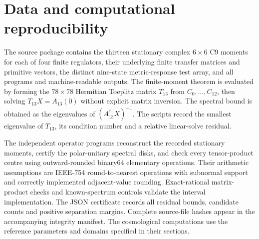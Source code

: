 \documentclass[11pt,a4paper]{article}
\numberwithin{equation}{section}
\begin{document}
\section{Data and computational reproducibility}

The source package contains the thirteen stationary complex $6\times6$ C9 moments for each of four finite regulators, their underlying finite transfer matrices and primitive vectors, the distinct nine-state metric-response test array, and all programs and machine-readable outputs. The finite-moment theorem is evaluated by forming the $78\times78$ Hermitian Toeplitz matrix $T_{13}$ from $C_0,\ldots,C_{12}$, then solving $T_{13}X=A_{13}(0)$ without explicit matrix inversion. The spectral bound is obtained as the eigenvalues of $(A_{13}^\dagger X)^{-1}$. The scripts record the smallest eigenvalue of $T_{13}$, its condition number and a relative linear-solve residual.

The independent operator programs reconstruct the recorded stationary moments, certify the polar-unitary spectral disks, and check every tensor-product centre using outward-rounded binary64 elementary operations. Their arithmetic assumptions are IEEE-754 round-to-nearest operations with subnormal support and correctly implemented adjacent-value rounding. Exact-rational matrix-product checks and known-spectrum controls validate the interval implementation. The JSON certificate records all residual bounds, candidate counts and positive separation margins. Complete source-file hashes appear in the accompanying integrity manifest. The cosmological computations use the reference parameters and domains specified in their sections.


\end{document}
